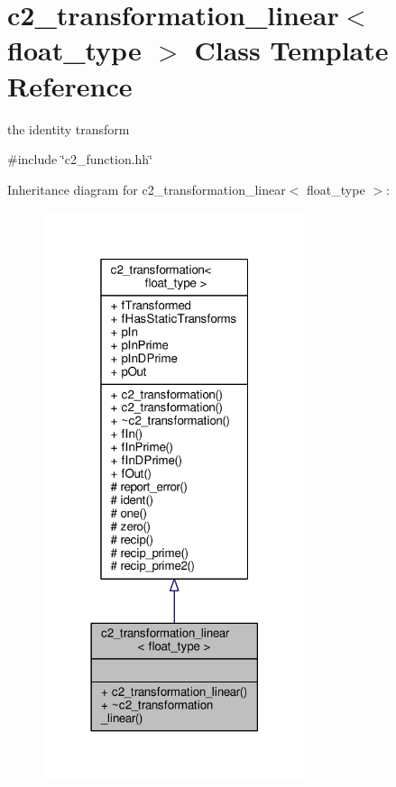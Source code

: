 \hypertarget{classc2__transformation__linear}{}\section{c2\+\_\+transformation\+\_\+linear$<$ float\+\_\+type $>$ Class Template Reference}
\label{classc2__transformation__linear}


the identity transform  




{\ttfamily \#include \char`\"{}c2\+\_\+function.\+hh\char`\"{}}



Inheritance diagram for c2\+\_\+transformation\+\_\+linear$<$ float\+\_\+type $>$\+:
\nopagebreak
\begin{figure}[H]
\begin{center}
\leavevmode
\includegraphics[width=218pt]{classc2__transformation__linear__inherit__graph}
\end{center}
\end{figure}


